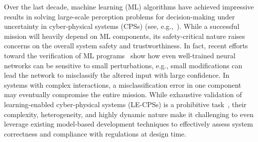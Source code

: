 Over the last decade, machine learning (ML) algorithms have achieved impressive results in solving large-scale  perception problems for decision-making under uncertainty in cyber-physical systems (CPSs) (see, e.g.,~\cite{Blum97,Jia14,Michalski13}). 
While a successful mission will heavily depend on ML components, its safety-critical nature raises concerns on the overall system safety and trustworthiness. In fact, recent efforts toward the verification of ML programs~\cite{Szegedy2013} show how even well-trained neural networks can be sensitive to small perturbations, e.g., small modifications can lead the network to misclassify the altered input with large confidence. In systems with complex interactions, a misclassification error in one component may eventually compromise the entire mission.  
% 
While exhaustive validation of learning-enabled cyber-physical systems (LE-CPSs) is a prohibitive task~\cite{Kalra16},
their complexity, heterogeneity, and highly dynamic nature
make it challenging to even leverage existing model-based development techniques to effectively assess  system correctness 
and compliance with regulations at design time.
